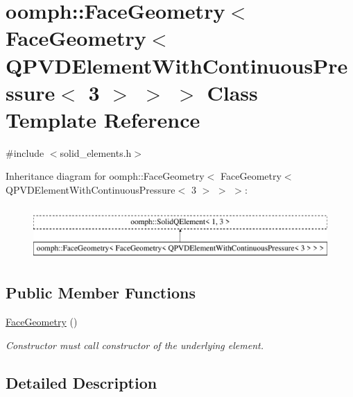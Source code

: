 \hypertarget{classoomph_1_1FaceGeometry_3_01FaceGeometry_3_01QPVDElementWithContinuousPressure_3_013_01_4_01_4_01_4}{}\section{oomph\+:\+:Face\+Geometry$<$ Face\+Geometry$<$ Q\+P\+V\+D\+Element\+With\+Continuous\+Pressure$<$ 3 $>$ $>$ $>$ Class Template Reference}
\label{classoomph_1_1FaceGeometry_3_01FaceGeometry_3_01QPVDElementWithContinuousPressure_3_013_01_4_01_4_01_4}


{\ttfamily \#include $<$solid\+\_\+elements.\+h$>$}

Inheritance diagram for oomph\+:\+:Face\+Geometry$<$ Face\+Geometry$<$ Q\+P\+V\+D\+Element\+With\+Continuous\+Pressure$<$ 3 $>$ $>$ $>$\+:\begin{figure}[H]
\begin{center}
\leavevmode
\includegraphics[height=2.000000cm]{classoomph_1_1FaceGeometry_3_01FaceGeometry_3_01QPVDElementWithContinuousPressure_3_013_01_4_01_4_01_4}
\end{center}
\end{figure}
\subsection*{Public Member Functions}
\begin{DoxyCompactItemize}
\item 
\hyperlink{classoomph_1_1FaceGeometry_3_01FaceGeometry_3_01QPVDElementWithContinuousPressure_3_013_01_4_01_4_01_4_a8fb064ae3243d87ecc4f983b1423a5c4}{Face\+Geometry} ()
\begin{DoxyCompactList}\small\item\em Constructor must call constructor of the underlying element. \end{DoxyCompactList}\end{DoxyCompactItemize}


\subsection{Detailed Description}
